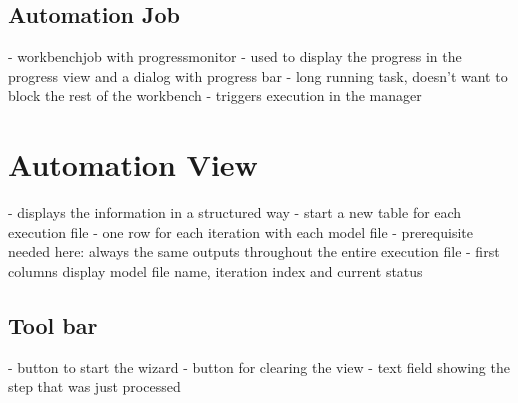 \subsection{Automation Job}
- workbenchjob with progressmonitor
- used to display the progress in the progress view and a dialog with progress bar
- long running task, doesn't want to block the rest of the workbench 
- triggers execution in the manager

\section{Automation View}
- displays the information in a structured way
- start a new table for each execution file
- one row for each iteration with each model file
 - prerequisite needed here: always the same outputs throughout the entire execution file
- first columns display model file name, iteration index and current status

\subsection{Tool bar}
- button to start the wizard
- button for clearing the view
- text field showing the step that was just processed

